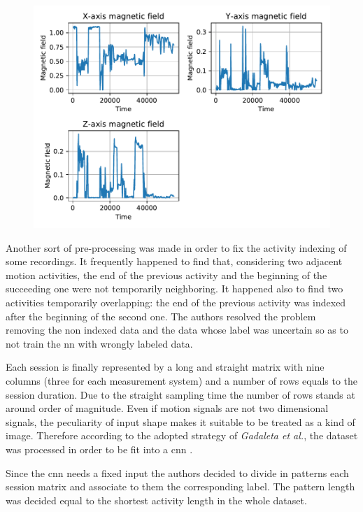 \begin{figure}[htp]
\includegraphics[scale=0.55]{magnetic_field_susanna.pdf}
\caption{}
\label{fig:mag}
\end{figure}


Another sort of pre-processing was made in order to fix the activity indexing of some recordings. It frequently happened to find that, considering two adjacent motion activities, the end of the previous activity and the beginning of the succeeding one were not temporarily neighboring. It happened also to find two activities temporarily overlapping: the end of the previous activity was indexed after the beginning of the second one. 
The authors resolved the problem removing the non indexed data and the data whose label was uncertain so as to not train the \gls{nn} with wrongly labeled data.

Each session is finally represented by a long and straight matrix with nine columns (three for each measurement system) and a number of rows equals to the session duration. Due to the straight sampling time the number of rows stands at around  order of magnitude. Even if motion signals are not two dimensional signals, the peculiarity of input shape makes it suitable to be treated as a kind of image. Therefore according to the adopted strategy of \textit{Gadaleta et al.}, the dataset was processed in order to be fit into a \gls{cnn} \cite{Gadaleta-2018}.


Since the \gls{cnn} needs a fixed input the authors decided to divide in patterns each session matrix and associate to them the corresponding label. The pattern length was decided equal to the shortest activity length in the whole dataset.



